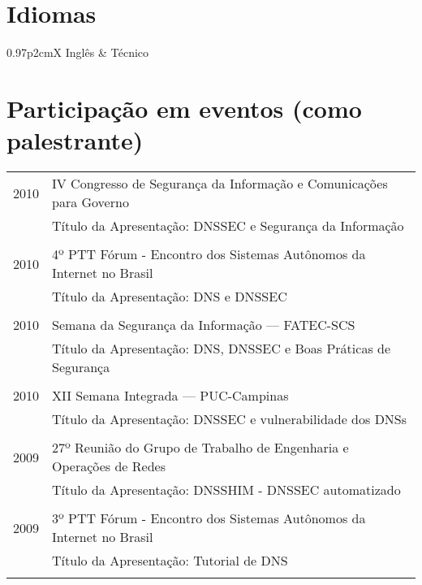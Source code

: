 \documentclass[a4paper, oneside, final]{scrartcl}
\begin{document}
\begin{center}
\section{Idiomas}

\begin{tabularx}{0.97\linewidth}{p{2cm}X}
Inglês      & Técnico\\
\end{tabularx}

\section{Participação em eventos (como palestrante)}

\begin{tabularx}{0.97\linewidth}{p{2cm}X}
2010        & IV Congresso de Segurança da Informação e Comunicações para Go\-ver\-no\\
            & Título da Apresentação: DNSSEC e Segurança da Informação\\ \\

2010        & 4º PTT Fórum - Encontro dos Sistemas Autônomos da Internet no Brasil\\
            & Título da Apresentação: DNS e DNSSEC\\ \\

2010        & Semana da Segurança da Informação --- FATEC-SCS\\
            & Título da Apresentação: DNS, DNSSEC e Boas Práticas de Segurança\\ \\

2010        & XII Semana Integrada --- PUC-Campinas\\
            & Título da Apresentação: DNSSEC e vulnerabilidade dos DNSs\\ \\

2009        & 27º Reunião do Grupo de Trabalho de Engenharia e Operações de Redes\\
            & Título da Apresentação: DNSSHIM - DNSSEC automatizado\\ \\

2009        & 3º PTT Fórum - Encontro dos Sistemas Autônomos da Internet no Brasil\\
            & Título da Apresentação: Tutorial de DNS\\ \\


\end{tabularx}
\end{center}
\end{document}
